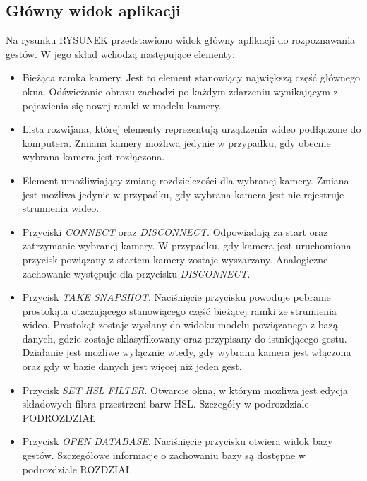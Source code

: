 \subsection{Główny widok aplikacji}
Na rysunku RYSUNEK przedstawiono widok główny aplikacji do rozpoznawania gestów. W jego skład wchodzą następujące elementy:
\begin{itemize}
	\item Bieżąca ramka kamery. Jest to element stanowiący największą część głównego okna. Odświeżanie obrazu zachodzi po każdym zdarzeniu wynikającym z pojawienia się nowej ramki w modelu kamery.
	\item Lista rozwijana, której elementy reprezentują urządzenia wideo podłączone do komputera. Zmiana kamery możliwa jedynie w przypadku, gdy obecnie wybrana kamera jest rozłączona.
	\item Element umożliwiający zmianę rozdzielczości dla wybranej kamery. Zmiana jest możliwa jedynie w przypadku, gdy wybrana kamera jest nie rejestruje strumienia wideo.
	\item Przyciski \textit{CONNECT} oraz \textit{DISCONNECT}. Odpowiadają za start oraz zatrzymanie wybranej kamery. W przypadku, gdy kamera jest uruchomiona przycisk powiązany z startem kamery zostaje wyszarzany. Analogiczne zachowanie występuje dla przycisku \textit{DISCONNECT}.
	\item Przycisk \textit{TAKE SNAPSHOT}. Naciśnięcie przycisku powoduje pobranie prostokąta otaczającego stanowiącego część bieżącej ramki ze strumienia wideo. Prostokąt zostaje wysłany do widoku modelu powiązanego z bazą danych, gdzie zostaje sklasyfikowany oraz przypisany do istniejącego gestu. Działanie jest możliwe wyłącznie wtedy, gdy wybrana kamera jest włączona oraz gdy w bazie danych jest więcej niż jeden gest. 
	\item Przycisk \textit{SET HSL FILTER}. Otwarcie okna, w którym możliwa jest edycja składowych filtra przestrzeni barw HSL. Szczegóły w podrozdziale PODROZDZIAŁ
	\item Przycisk \textit{OPEN DATABASE}. Naciśnięcie przycisku otwiera widok bazy gestów. Szczegółowe informacje o zachowaniu bazy są dostępne w podrozdziale ROZDZIAŁ
\end{itemize}


